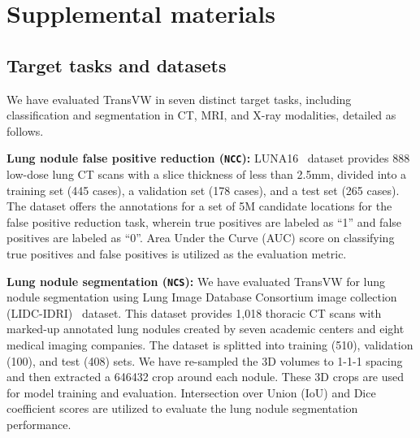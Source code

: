 \documentclass[journal,twoside,web]{ieeecolor}
\begin{document}

\newpage

\appendices
\section{Supplemental materials} 


\subsection{Target tasks and datasets}
\label{appendix_dataset}
We have evaluated TransVW in seven distinct target tasks, including classification and segmentation in CT, MRI, and X-ray modalities, detailed as follows.

\smallskip
\noindent\textbf{Lung nodule false positive reduction (\texttt{NCC}):}
LUNA16~\cite{setio2017validation} dataset provides 888 low-dose lung CT scans with a slice thickness of less than 2.5mm, divided into a training set (445 cases), a validation set (178 cases), and a test set (265 cases).
The dataset offers the annotations for a set of 5M candidate locations for the false positive reduction task, wherein true positives are labeled as ``1'' and false positives are labeled as ``0''. Area Under the Curve (AUC) score on classifying true positives and false positives is utilized as the evaluation metric.

\smallskip
\noindent\textbf{Lung nodule segmentation (\texttt{NCS}):}
We have evaluated TransVW for lung nodule segmentation using Lung Image Database Consortium image collection (LIDC-IDRI)~\cite{armato2011lung} dataset. This 
 dataset provides 1,018 thoracic CT scans with marked-up annotated lung nodules created by seven academic centers and eight medical imaging companies. The dataset is splitted into training (510), validation (100), and test (408) sets. 
We have re-sampled the 3D volumes to 1-1-1 spacing and then extracted a 646432 crop around each nodule. These 3D crops are used for model training and evaluation. Intersection over Union (IoU) and  Dice coefficient scores are utilized to evaluate the lung nodule segmentation performance.
\end{document}
